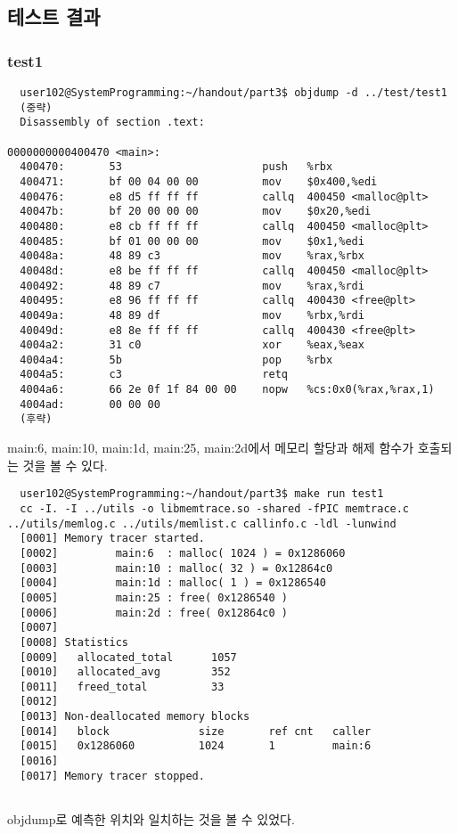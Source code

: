 \documentclass{report}
\begin{document}
\subsection{테스트 결과}
\subsubsection{test1}
\begin{verbatim}
  user102@SystemProgramming:~/handout/part3$ objdump -d ../test/test1
  (중략)
  Disassembly of section .text:

0000000000400470 <main>:
  400470:       53                      push   %rbx
  400471:       bf 00 04 00 00          mov    $0x400,%edi
  400476:       e8 d5 ff ff ff          callq  400450 <malloc@plt>
  40047b:       bf 20 00 00 00          mov    $0x20,%edi
  400480:       e8 cb ff ff ff          callq  400450 <malloc@plt>
  400485:       bf 01 00 00 00          mov    $0x1,%edi
  40048a:       48 89 c3                mov    %rax,%rbx
  40048d:       e8 be ff ff ff          callq  400450 <malloc@plt>
  400492:       48 89 c7                mov    %rax,%rdi
  400495:       e8 96 ff ff ff          callq  400430 <free@plt>
  40049a:       48 89 df                mov    %rbx,%rdi
  40049d:       e8 8e ff ff ff          callq  400430 <free@plt>
  4004a2:       31 c0                   xor    %eax,%eax
  4004a4:       5b                      pop    %rbx
  4004a5:       c3                      retq
  4004a6:       66 2e 0f 1f 84 00 00    nopw   %cs:0x0(%rax,%rax,1)
  4004ad:       00 00 00
  (후략)
\end{verbatim}
main:6, main:10, main:1d, main:25, main:2d에서 메모리 할당과 해제 함수가 호출되는 것을 볼 수 있다.

\begin{verbatim}
  user102@SystemProgramming:~/handout/part3$ make run test1
  cc -I. -I ../utils -o libmemtrace.so -shared -fPIC memtrace.c ../utils/memlog.c ../utils/memlist.c callinfo.c -ldl -lunwind
  [0001] Memory tracer started.
  [0002]         main:6  : malloc( 1024 ) = 0x1286060
  [0003]         main:10 : malloc( 32 ) = 0x12864c0
  [0004]         main:1d : malloc( 1 ) = 0x1286540
  [0005]         main:25 : free( 0x1286540 )
  [0006]         main:2d : free( 0x12864c0 )
  [0007]
  [0008] Statistics
  [0009]   allocated_total      1057
  [0010]   allocated_avg        352
  [0011]   freed_total          33
  [0012]
  [0013] Non-deallocated memory blocks
  [0014]   block              size       ref cnt   caller
  [0015]   0x1286060          1024       1         main:6
  [0016]
  [0017] Memory tracer stopped.
  
\end{verbatim}
objdump로 예측한 위치와 일치하는 것을 볼 수 있었다.
\end{document}
